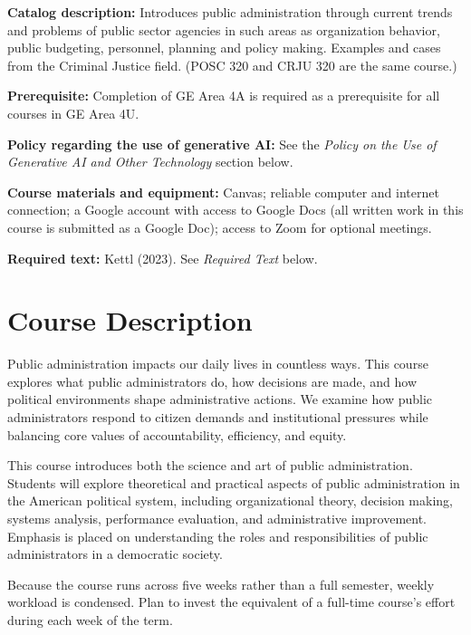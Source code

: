 \documentclass[12pt]{article}
\begin{document}
\vspace{0.5em}
\begin{flatlist}
\item \textbf{Catalog description:} Introduces public administration through current trends and problems of public sector agencies in such areas as organization behavior, public budgeting, personnel, planning and policy making. Examples and cases from the Criminal Justice field. (POSC 320 and CRJU 320 are the same course.)
\item \textbf{Prerequisite:} Completion of GE Area 4A is required as a prerequisite for all courses in GE Area 4U.
\item \textbf{Policy regarding the use of generative AI:} See the \emph{Policy on the Use of Generative AI and Other Technology} section below.
\item \textbf{Course materials and equipment:} Canvas; reliable computer and internet connection; a Google account with access to Google Docs (all written work in this course is submitted as a Google Doc); access to Zoom for optional meetings.
\item \textbf{Required text:} Kettl (2023). See \emph{Required Text} below.
\end{flatlist}

\section*{Course Description}

{\setlength{\parindent}{0pt}\setlength{\parskip}{0.6\baselineskip}%
Public administration impacts our daily lives in countless ways. This course explores what public administrators do, how decisions are made, and how political environments shape administrative actions. We examine how public administrators respond to citizen demands and institutional pressures while balancing core values of accountability, efficiency, and equity.

This course introduces both the science and art of public administration. Students will explore theoretical and practical aspects of public administration in the American political system, including organizational theory, decision making, systems analysis, performance evaluation, and administrative improvement. Emphasis is placed on understanding the roles and responsibilities of public administrators in a democratic society.

Because the course runs across five weeks rather than a full semester, weekly workload is condensed. Plan to invest the equivalent of a full-time course's effort during each week of the term.
}
\end{document}

